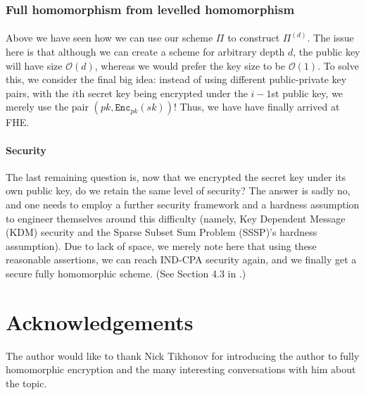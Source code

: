 \documentclass{article}
\theoremstyle{definition}
\theoremstyle{example}
\newcommand{\Enc}{\texttt{Enc}}
\newcommand{\Oh}{\mathcal{O}}
\begin{document}
\subsubsection{Full homomorphism from levelled homomorphism}
\paragraph{} Above we have seen how we can use our scheme $\Pi$ to construct
$\Pi^{(d)}$. The issue here is that although we can create a scheme for
arbitrary depth $d$, the public key will have size $\Oh(d)$, whereas we would
prefer the key size to be $\Oh(1)$. To solve this, we consider the final big
idea: instead of using different public-private key pairs, with the $i$th secret
key being encrypted under the $i-1$st public key, we merely use the pair $(pk,
\Enc_{pk}(sk))$! Thus, we have have finally arrived at FHE.
\paragraph{Security} The last remaining question is, now that we encrypted the
secret key under its own public key, do we retain the same level of security?
The answer is sadly no, and one needs to employ a further security framework and
a hardness assumption to engineer themselves around this difficulty (namely, Key
Dependent Message (KDM) security and the Sparse Subset Sum Problem (SSSP)'s
hardness assumption). Due to lack of space, we merely note here that using these
reasonable assertions, we can reach IND-CPA security again, and we finally get a
secure fully homomorphic scheme. (See Section 4.3 in \cite{gentry2009fully}.)
\section*{Acknowledgements} The author would like to thank Nick Tikhonov for introducing the author to fully homomorphic encryption and the many interesting
conversations with him about the topic.
\end{document}
